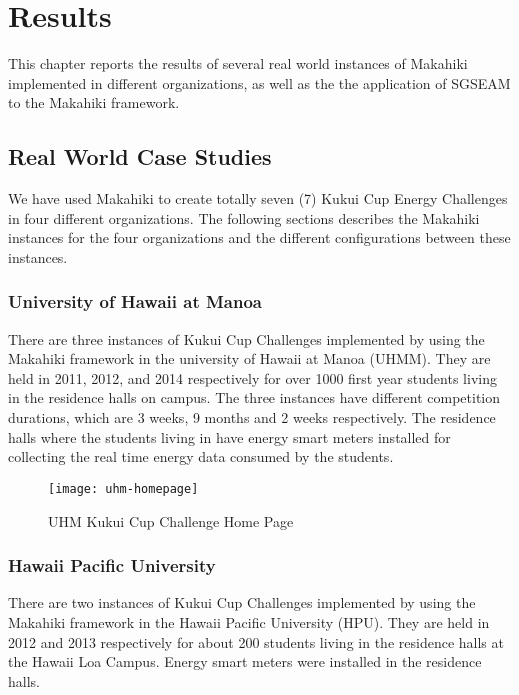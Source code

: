\chapter{Results}
\label{cha:Results}

This chapter reports the results of several real world instances of Makahiki implemented in different organizations, as well as the the application of SGSEAM to the Makahiki framework.

\section{Real World Case Studies}

We have used Makahiki to create totally seven (7) Kukui Cup Energy Challenges in four different organizations. The following sections describes the Makahiki instances for the four organizations and the different configurations between these instances.

\subsection{University of Hawaii at Manoa}

There are three instances of Kukui Cup Challenges implemented by using the Makahiki framework in the university of Hawaii at Manoa (UHMM). They are held in 2011, 2012, and 2014 respectively for over 1000 first year students living in the residence halls on campus. The three instances have different competition durations, which are 3 weeks, 9 months and 2 weeks respectively. The residence halls where the students living in have energy smart meters installed for collecting the real time energy data consumed by the students. 

\begin{figure}[ht!]
   \centering
   \texttt{[image: uhm-homepage]}
   \caption{UHM Kukui Cup Challenge Home Page}
   \label{fig:uhm-homepage}
\end{figure}


\subsection{Hawaii Pacific University}

There are two instances of Kukui Cup Challenges implemented by using the Makahiki framework in the Hawaii Pacific University (HPU). They are held in 2012 and 2013 respectively for about 200 students living in the residence halls at the Hawaii Loa Campus. Energy smart meters were installed in the residence halls.


